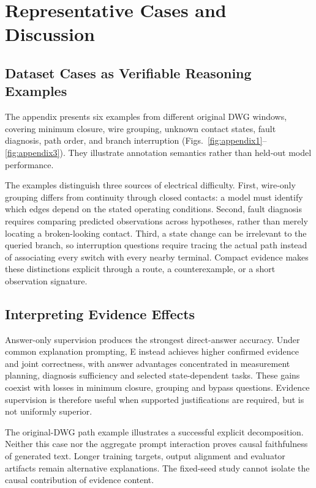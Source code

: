 \section{Representative Cases and Discussion}\label{sec:discussion}
\subsection{Dataset Cases as Verifiable Reasoning Examples}
The appendix presents six examples from different original DWG windows, covering minimum closure, wire grouping, unknown contact states, fault diagnosis, path order, and branch interruption (Figs.~\ref{fig:appendix1}--\ref{fig:appendix3}). They illustrate annotation semantics rather than held-out model performance.

The examples distinguish three sources of electrical difficulty. First, wire-only grouping differs from continuity through closed contacts: a model must identify which edges depend on the stated operating conditions. Second, fault diagnosis requires comparing predicted observations across hypotheses, rather than merely locating a broken-looking contact. Third, a state change can be irrelevant to the queried branch, so interruption questions require tracing the actual path instead of associating every switch with every nearby terminal. Compact evidence makes these distinctions explicit through a route, a counterexample, or a short observation signature.

\subsection{Interpreting Evidence Effects}
Answer-only supervision produces the strongest direct-answer accuracy. Under common explanation prompting, E instead achieves higher confirmed evidence and joint correctness, with answer advantages concentrated in measurement planning, diagnosis sufficiency and selected state-dependent tasks. These gains coexist with losses in minimum closure, grouping and bypass questions. Evidence supervision is therefore useful when supported justifications are required, but is not uniformly superior.

The original-DWG path example illustrates a successful explicit decomposition. Neither this case nor the aggregate prompt interaction proves causal faithfulness of generated text. Longer training targets, output alignment and evaluator artifacts remain alternative explanations. The fixed-seed study cannot isolate the causal contribution of evidence content.

